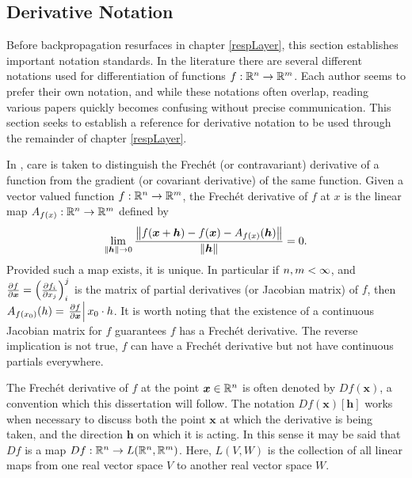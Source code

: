 \subsection{Derivative Notation}\label{subsect:derivNotation}

Before backpropagation resurfaces in chapter \ref{respLayer}, this section establishes important notation standards.  In the literature \cite{abraham1967transversal, manton2012differential, magnus1985matrix, matGradChain} there are several different notations used for differentiation of functions \( f:\mathbb R^n\rightarrow \mathbb R^m \). Each author seems to prefer their own notation, and while these notations often overlap, reading various papers quickly becomes confusing without precise communication. This section seeks to establish a reference for derivative notation to be used through the remainder of chapter \ref{respLayer}.

In \citep{patternnet}, care is taken to distinguish the Frech\'et (or contravariant) derivative of a function from the gradient (or covariant derivative) of the same function. Given a vector valued function \( f:\mathbb R^n\rightarrow\mathbb R^m \), the Frech\'et derivative of \( f \) at \(x\) is the linear map \( A_{ f(x)}:\mathbb R^n\rightarrow\mathbb R^m \) defined by
\begin{equation}\label{eqn:frechetDefn}
	\lim_{\norm{\bm h}\rightarrow 0} \frac{\norm{f(\bm x+\bm h)-f(\bm x)-A_{f(x)}(\bm h)}}{\norm{\bm h}}=0.
\end{equation}
Provided such a map exists, it is unique.  In particular if \( n,m<\infty \), and \( \pdv{f}{\bm x} = \left(\pdv{f_i}{x_j}\right)_i^j \) is the matrix of partial derivatives (or Jacobian matrix) of \( f \), then \( A_{f(x_0)}(h) = \eval{\pdv{f}{\bm x}}{x_0}\cdot h \).  It is worth noting that the existence of a continuous Jacobian matrix for \( f \) guarantees \( f \) has a Frech\'et derivative.  The reverse implication is not true, \( f \) can have a Frech\'et derivative but not have continuous partials everywhere.

The Frech\'et derivative of \( f \) at the point \( \bm x\in \mathbb R^n \) is often denoted by \( Df(\bm x) \), a convention which this dissertation will follow.  The notation \( Df(\bm x)[\bm h] \) works when necessary to discuss both the point \( \bm x \) at which the derivative is being taken, and the direction \( \bm h \) on which it is acting. In this sense it may be said that \( Df \) is a map \( Df:\mathbb R^n\rightarrow L(\mathbb R^n,\mathbb R^m)\). Here, \( L(V,W) \) is the collection of all linear maps from one real vector space \( V \) to another real vector space \( W \).  

